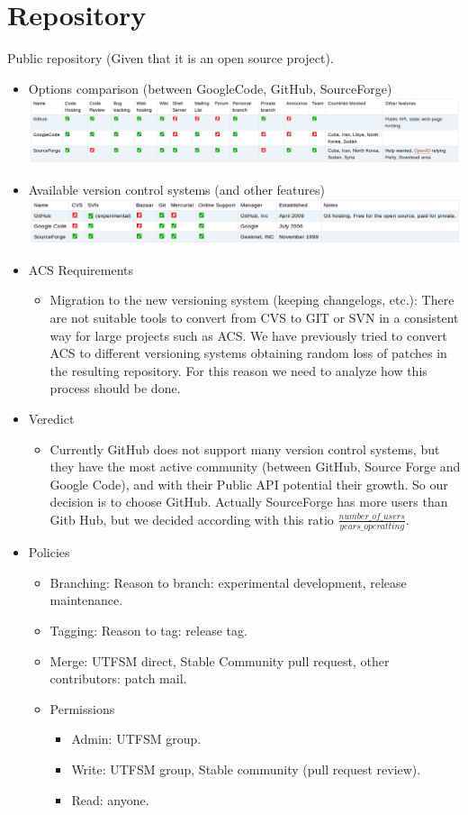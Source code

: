 \section{Repository}
Public repository (Given that it is an open source project).
\begin{itemize}
	\item Options comparison (between GoogleCode, GitHub, SourceForge) \\
		\includegraphics[width=\textwidth]{img/1}
	\item Available version control systems (and other features) \\
		\includegraphics[width=\textwidth]{img/2}
	\item ACS Requirements
		\begin{itemize}
			\item Migration to the new versioning system (keeping changelogs, etc.): There are not suitable tools to convert from CVS to GIT or SVN in 
				a consistent way for large projects such as ACS. We have previously tried to convert ACS to different versioning systems obtaining 
				random loss of patches in the resulting repository. For this reason we need to analyze how this process should be done.
		\end{itemize}
	\item Veredict
		\begin{itemize}
			\item Currently GitHub does not support many version control systems, but they have the most active community (between GitHub, Source Forge 
				and Google Code), and with their Public API potential their growth. So our decision is to choose GitHub. Actually SourceForge has
				more users than Gitb Hub, but we decided according with this ratio $\frac{number\_of\_users}{years\_operatting}$.
		\end{itemize}
	\item Policies
		\begin{itemize}
			\item Branching: Reason to branch: experimental development, release maintenance.
			\item Tagging: Reason to tag: release tag.
			\item Merge: UTFSM direct, Stable Community pull request, other contributors: patch mail.
			\item Permissions
				\begin{itemize}
					\item Admin: UTFSM group.
					\item Write: UTFSM group, Stable community (pull request review).
					\item Read: anyone.	
				\end{itemize}
			\end{itemize}
\end{itemize}
